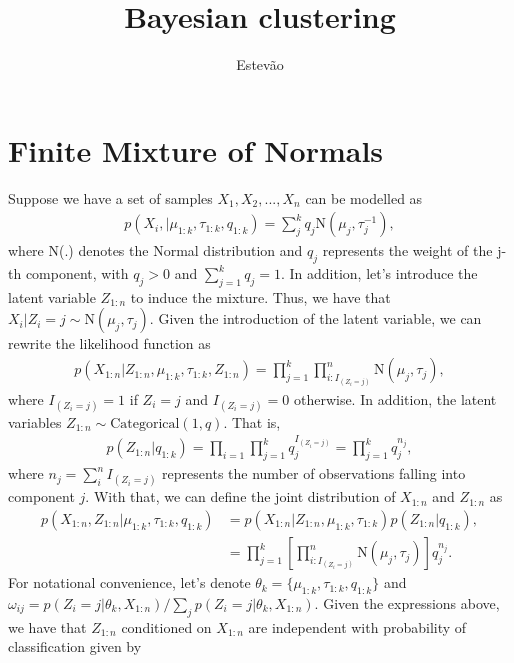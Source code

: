 \documentclass{article}
\title{Bayesian clustering}
\author{Estev\~ao}
\begin{document}
\maketitle

\section{Finite Mixture of Normals}
Suppose we have a set of samples $X_{1}, X_{2}, ..., X_{n}$ can be modelled as
\begin{align}
    p(X_{i}, | \mu_{1:k}, \tau_{1:k}, q_{1:k}) = \sum_{j}^{k} q_{j} \mbox{N}(\mu_{j}, \tau_{j}^{-1}),
\end{align}
where \mbox{N}(.) denotes the Normal distribution and $q_{j}$ represents the weight of the j-th component, with $q_{j} > 0$ and $\sum_{j=1}^{k} q_{j} = 1$. In addition, let's introduce the latent variable $Z_{1:n}$ to induce the mixture. Thus, we have that $X_{i}|Z_{i} = j \sim \mbox{N}(\mu_{j}, \tau_{j})$. Given the introduction of the latent variable, we can rewrite the likelihood function as
\begin{align}
    p(X_{1:n}| Z_{1:n}, \mu_{1:k}, \tau_{1:k}, Z_{1:n}) = \prod_{j=1}^{k} \prod_{i: I_{(Z_{i} = j)}}^{n} \mbox{N}(\mu_{j}, \tau_{j}),
\end{align}
where $I_{(Z_{i} = j)} = 1$ if $Z_{i} = j$ and $I_{(Z_{i} = j)} = 0$ otherwise. In addition, the latent variables $Z_{1:n} \sim \mbox{Categorical}(1,q)$. That is,
\begin{align}
    p(Z_{1:n}|q_{1:k}) = \prod_{i=1} \prod_{j=1}^{k} q_{j}^{I_{(Z_{i} = j)}} = \prod_{j=1}^{k} q_{j}^{n_{j}}, 
\end{align}
where $n_{j} = \sum_{i}^{n} I_{(Z_{i} = j)}$ represents the number of observations falling into component $j$. With that, we can define the joint distribution of $X_{1:n}$ and $Z_{1:n}$ as
\begin{align}
    p(X_{1:n}, Z_{1:n}| \mu_{1:k}, \tau_{1:k}, q_{1:k}) & = p(X_{1:n}| Z_{1:n}, \mu_{1:k}, \tau_{1:k}) p(Z_{1:n}| q_{1:k}), \\
    & = \prod_{j=1}^{k} \left[ \prod_{i: I_{(Z_{i} = j)}}^{n} \mbox{N}(\mu_{j}, \tau_{j}) \right] q_{j}^{n_{j}}.
\end{align}
For notational convenience, let's denote $\theta_{k} = \{\mu_{1:k}, \tau_{1:k}, q_{1:k}\}$ and $\omega_{ij} = p(Z_{i} = j| \theta_{k}, X_{1:n})/ \sum_{j} p(Z_{i} = j| \theta_{k}, X_{1:n})$. Given the expressions above, we have that $Z_{1:n}$ conditioned on $X_{1:n}$ are independent with probability of classification given by
\end{document}
